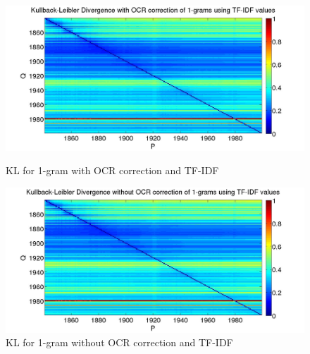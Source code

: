 \begin{figure}[H]
    \begin{minipage}[b]{0.48\linewidth}
        \includegraphics[scale=0.15]{Pictures/kullback-leibler/KL_1-grams_with_correction_tfidf.jpg}
        \caption{KL for 1-gram with OCR correction and TF-IDF}
        \label{KL-TC1}
    \end{minipage}\hfill
    \begin{minipage}[b]{0.5\linewidth}
        \includegraphics[scale=0.15]{Pictures/kullback-leibler/KL_1-grams_without_correction_tfidf.jpg}
        \caption{KL for 1-gram without OCR correction and TF-IDF}
        \label{KL-TN1}
    \end{minipage}\hfill
\end{figure}

